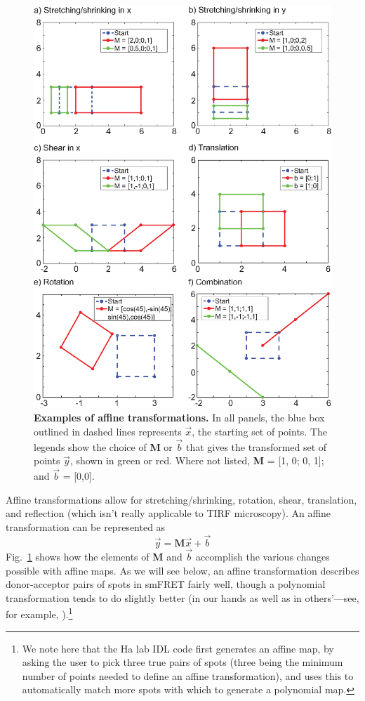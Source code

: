 \documentclass[11pt]{article}
\begin{document}
\begin{figure}
\begin{center}
\includegraphics[width=5in]{TransformationFigures/AffineExamples.eps}
\caption[Examples of affine transformations.]{{\bf Examples of affine transformations.} In all panels, the blue box outlined in dashed lines represents $\vec{x}$, the starting set of points. The legends show the choice of {\bf M} or $\vec{b}$ that gives the transformed set of points $\vec{y}$, shown in green or red.  Where not listed, {\bf M} = [1, 0; 0, 1]; and $\vec{b}$ = [0,0]. }\label{fig:AffineExamples}
\end{center}
\end{figure}


Affine transformations allow for stretching/shrinking, rotation, shear, translation, and reflection (which isn't really applicable to TIRF microscopy).  An affine transformation can be represented as 
\begin{equation}
\vec{y} = \mathbf{M}\vec{x} + \vec{b}\label{eqn:affine}
\end{equation}
Fig.~\ref{fig:AffineExamples} shows how the elements of {\bf M} and $\vec{b}$ accomplish the various changes possible with affine maps.  As we will see below, an affine transformation describes donor-acceptor pairs of spots in smFRET fairly well, though a polynomial transformation tends to do slightly better (in our hands as well as in others'---see, for example, \cite{Joo2007,Deindl2012}).\footnote{We note here that the Ha lab IDL code first generates an affine map, by asking the user to pick three true pairs of spots (three being the minimum number of points needed to define an affine transformation), and uses this to automatically match more spots with which to generate a polynomial map.}
\end{document}
